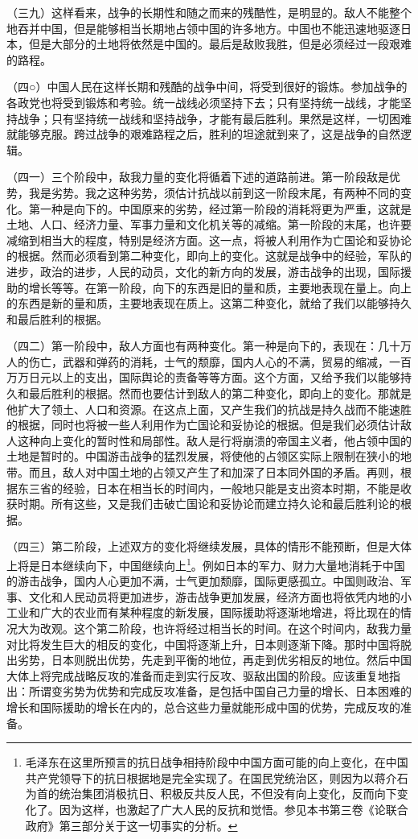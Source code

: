 \documentclass[UTF8, 12pt, a4paper]{ctexrep}
\begin{document}
（三九）这样看来，战争的长期性和随之而来的残酷性，是明显的。敌人不能整个地吞并中国，但是能够相当长期地占领中国的许多地方。中国也不能迅速地驱逐日本，但是大部分的土地将依然是中国的。最后是敌败我胜，但是必须经过一段艰难的路程。

（四○）中国人民在这样长期和残酷的战争中间，将受到很好的锻炼。参加战争的各政党也将受到锻炼和考验。统一战线必须坚持下去；只有坚持统一战线，才能坚持战争；只有坚持统一战线和坚持战争，才能有最后胜利。果然是这样，一切困难就能够克服。跨过战争的艰难路程之后，胜利的坦途就到来了，这是战争的自然逻辑。

（四一）三个阶段中，敌我力量的变化将循着下述的道路前进。第一阶段敌是优势，我是劣势。我之这种劣势，须估计抗战以前到这一阶段末尾，有两种不同的变化。第一种是向下的。中国原来的劣势，经过第一阶段的消耗将更为严重，这就是土地、人口、经济力量、军事力量和文化机关等的减缩。第一阶段的末尾，也许要减缩到相当大的程度，特别是经济方面。这一点，将被人利用作为亡国论和妥协论的根据。然而必须看到第二种变化，即向上的变化。这就是战争中的经验，军队的进步，政治的进步，人民的动员，文化的新方向的发展，游击战争的出现，国际援助的增长等等。在第一阶段，向下的东西是旧的量和质，主要地表现在量上。向上的东西是新的量和质，主要地表现在质上。这第二种变化，就给了我们以能够持久和最后胜利的根据。

（四二）第一阶段中，敌人方面也有两种变化。第一种是向下的，表现在：几十万人的伤亡，武器和弹药的消耗，士气的颓靡，国内人心的不满，贸易的缩减，一百万万日元以上的支出，国际舆论的责备等等方面。这个方面，又给予我们以能够持久和最后胜利的根据。然而也要估计到敌人的第二种变化，即向上的变化。那就是他扩大了领土、人口和资源。在这点上面，又产生我们的抗战是持久战而不能速胜的根据，同时也将被一些人利用作为亡国论和妥协论的根据。但是我们必须估计敌人这种向上变化的暂时性和局部性。敌人是行将崩溃的帝国主义者，他占领中国的土地是暂时的。中国游击战争的猛烈发展，将使他的占领区实际上限制在狭小的地带。而且，敌人对中国土地的占领又产生了和加深了日本同外国的矛盾。再则，根据东三省的经验，日本在相当长的时间内，一般地只能是支出资本时期，不能是收获时期。所有这些，又是我们击破亡国论和妥协论而建立持久论和最后胜利论的根据。

（四三）第二阶段，上述双方的变化将继续发展，具体的情形不能预断，但是大体上将是日本继续向下，中国继续向上\footnote{毛泽东在这里所预言的抗日战争相持阶段中中国方面可能的向上变化，在中国共产党领导下的抗日根据地是完全实现了。在国民党统治区，则因为以蒋介石为首的统治集团消极抗日、积极反共反人民，不但没有向上变化，反而向下变化了。因为这样，也激起了广大人民的反抗和觉悟。参见本书第三卷《论联合政府》第三部分关于这一切事实的分析。}。例如日本的军力、财力大量地消耗于中国的游击战争，国内人心更加不满，士气更加颓靡，国际更感孤立。中国则政治、军事、文化和人民动员将更加进步，游击战争更加发展，经济方面也将依凭内地的小工业和广大的农业而有某种程度的新发展，国际援助将逐渐地增进，将比现在的情况大为改观。这个第二阶段，也许将经过相当长的时间。在这个时间内，敌我力量对比将发生巨大的相反的变化，中国将逐渐上升，日本则逐渐下降。那时中国将脱出劣势，日本则脱出优势，先走到平衡的地位，再走到优劣相反的地位。然后中国大体上将完成战略反攻的准备而走到实行反攻、驱敌出国的阶段。应该重复地指出：所谓变劣势为优势和完成反攻准备，是包括中国自己力量的增长、日本困难的增长和国际援助的增长在内的，总合这些力量就能形成中国的优势，完成反攻的准备。
\end{document}
